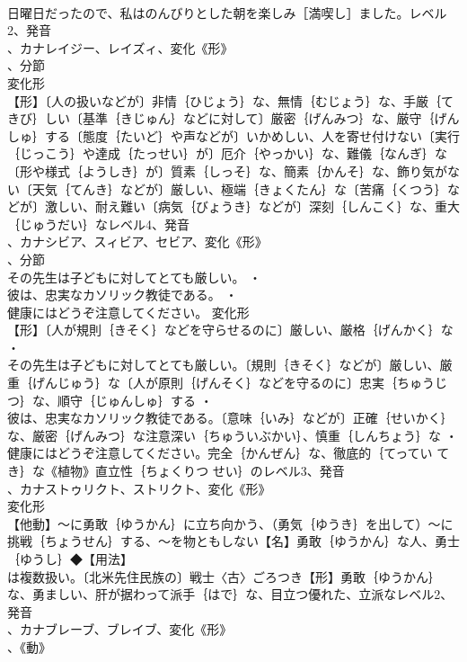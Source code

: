 \documentclass[8pt]{extreport}
\begin{document}
\begin{CJK}{UTF8}{min}
\\	日曜日だったので、私はのんびりとした朝を楽しみ［満喫し］ました。レベル2、発音
\\	、カナレイジー、レイズィ、変化《形》
\\	、分節
\\	変化形 
\\	【形】〔人の扱いなどが〕非情｛ひじょう｝な、無情｛むじょう｝な、手厳｛てきび｝しい〔基準｛きじゅん｝などに対して〕厳密｛げんみつ｝な、厳守｛げんしゅ｝する〔態度｛たいど｝や声などが〕いかめしい、人を寄せ付けない〔実行｛じっこう｝や達成｛たっせい｝が〕厄介｛やっかい｝な、難儀｛なんぎ｝な〔形や様式｛ようしき｝が〕質素｛しっそ｝な、簡素｛かんそ｝な、飾り気がない〔天気｛てんき｝などが〕厳しい、極端｛きょくたん｝な〔苦痛｛くつう｝などが〕激しい、耐え難い〔病気｛びょうき｝などが〕深刻｛しんこく｝な、重大｛じゅうだい｝なレベル4、発音
\\	、カナシビア、スィビア、セビア、変化《形》
\\	、分節
\\	その先生は子どもに対してとても厳しい。 ・
\\	彼は、忠実なカソリック教徒である。 ・
\\	健康にはどうぞ注意してください。	変化形 
\\	【形】〔人が規則｛きそく｝などを守らせるのに〕厳しい、厳格｛げんかく｝な ・
\\	その先生は子どもに対してとても厳しい。〔規則｛きそく｝などが〕厳しい、厳重｛げんじゅう｝な〔人が原則｛げんそく｝などを守るのに〕忠実｛ちゅうじつ｝な、順守｛じゅんしゅ｝する ・
\\	彼は、忠実なカソリック教徒である。〔意味｛いみ｝などが〕正確｛せいかく｝な、厳密｛げんみつ｝な注意深い｛ちゅういぶかい｝、慎重｛しんちょう｝な ・
\\	健康にはどうぞ注意してください。完全｛かんぜん｝な、徹底的｛てってい てき｝な《植物》直立性｛ちょくりつ せい｝のレベル3、発音
\\	、カナストゥリクト、ストリクト、変化《形》
\\	変化形 
\\	【他動】～に勇敢｛ゆうかん｝に立ち向かう、（勇気｛ゆうき｝を出して）～に挑戦｛ちょうせん｝する、～を物ともしない【名】勇敢｛ゆうかん｝な人、勇士｛ゆうし｝◆【用法】
\\	は複数扱い。〔北米先住民族の〕戦士〈古〉ごろつき【形】勇敢｛ゆうかん｝な、勇ましい、肝が据わって派手｛はで｝な、目立つ優れた、立派なレベル2、発音
\\	、カナブレーブ、ブレイブ、変化《形》
\\	、《動》

\end{CJK}
\end{document}
